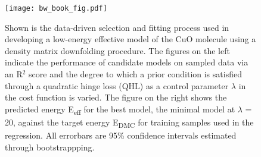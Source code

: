 \documentclass{article}
\begin{document}
\begin{figure}
	\begin{center}
    \texttt{[image: bw\_book\_fig.pdf]}
  \end{center}
  \caption{Shown is the data-driven selection and fitting process used in developing a low-energy effective model of the CuO molecule using a density matrix downfolding procedure. The figures on the left indicate the performance of candidate models on sampled data via an R$^2$ score and the degree to which a prior condition is satisfied through a quadratic hinge loss (QHL) as a control parameter $\lambda$ in the cost function is varied. The figure on the right shows the predicted energy E\textsubscript{eff} for the best model, the minimal model at $\lambda$ = 20, against the target energy E\textsubscript{DMC} for training samples used in the regression. All errorbars are 95\% confidence intervals estimated through bootstrappping.}
\end{figure}
\end{document}
